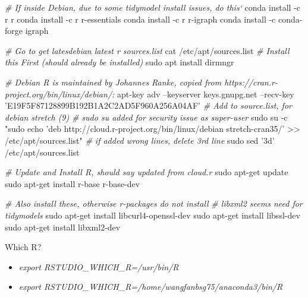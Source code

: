 \documentclass[]{article}
\newenvironment{Shaded}{\begin{snugshade}}{\end{snugshade}}
\newcommand{\CommentTok}[1]{\textcolor[rgb]{0.56,0.35,0.01}{\textit{#1}}}
\newcommand{\ExtensionTok}[1]{#1}
\newcommand{\FunctionTok}[1]{\textcolor[rgb]{0.00,0.00,0.00}{#1}}
\newcommand{\NormalTok}[1]{#1}
\newcommand{\StringTok}[1]{\textcolor[rgb]{0.31,0.60,0.02}{#1}}
\providecommand{\tightlist}{%
  \setlength{\itemsep}{0pt}\setlength{\parskip}{0pt}}
\begin{document}
\begin{Shaded}
\begin{Highlighting}[]
\CommentTok{# If inside Debian, due to some tidymodel install issues, do this`}
\ExtensionTok{conda}\NormalTok{ install -c r r}
\ExtensionTok{conda}\NormalTok{ install -c r r-essentials}
\ExtensionTok{conda}\NormalTok{ install -c r r-igraph}
\ExtensionTok{conda}\NormalTok{ install -c conda-forge igraph}

\CommentTok{# Go to get latesdebian latest r sources.list}
\FunctionTok{cat}\NormalTok{ /etc/apt/sources.list}
\CommentTok{# Install this First (should already be installed)}
\FunctionTok{sudo}\NormalTok{ apt install dirmngr}

\CommentTok{# Debian R is maintained by Johannes Ranke, copied from https://cran.r-project.org/bin/linux/debian/:}
\ExtensionTok{apt-key}\NormalTok{ adv --keyserver keys.gnupg.net --recv-key }\StringTok{'E19F5F87128899B192B1A2C2AD5F960A256A04AF'}
\CommentTok{# Add to source.list, for debian stretch (9)}
\CommentTok{# sudo su added for security issue as super-user}
\FunctionTok{sudo}\NormalTok{ su -c }\StringTok{"sudo echo 'deb http://cloud.r-project.org/bin/linux/debian stretch-cran35/' >> /etc/apt/sources.list"}
\CommentTok{# if added wrong lines, delete 3rd line}
\FunctionTok{sudo}\NormalTok{ sed }\StringTok{'3d'}\NormalTok{ /etc/apt/sources.list}

\CommentTok{# Update and Install R, should say updated from cloud.r}
\FunctionTok{sudo}\NormalTok{ apt-get update}
\FunctionTok{sudo}\NormalTok{ apt-get install r-base r-base-dev}

\CommentTok{# Also install these, otherwise r-packages do not install}
\CommentTok{# libxml2 seems need for tidymodels}
\FunctionTok{sudo}\NormalTok{ apt-get install libcurl4-openssl-dev}
\FunctionTok{sudo}\NormalTok{ apt-get install libssl-dev}
\FunctionTok{sudo}\NormalTok{ apt-get install libxml2-dev}
\end{Highlighting}
\end{Shaded}

Which R?

\begin{itemize}
\tightlist
\item
  \emph{export RSTUDIO\_WHICH\_R=/usr/bin/R}
\item
  \emph{export RSTUDIO\_WHICH\_R=/home/wangfanbsg75/anaconda3/bin/R}
\end{itemize}
\end{document}
